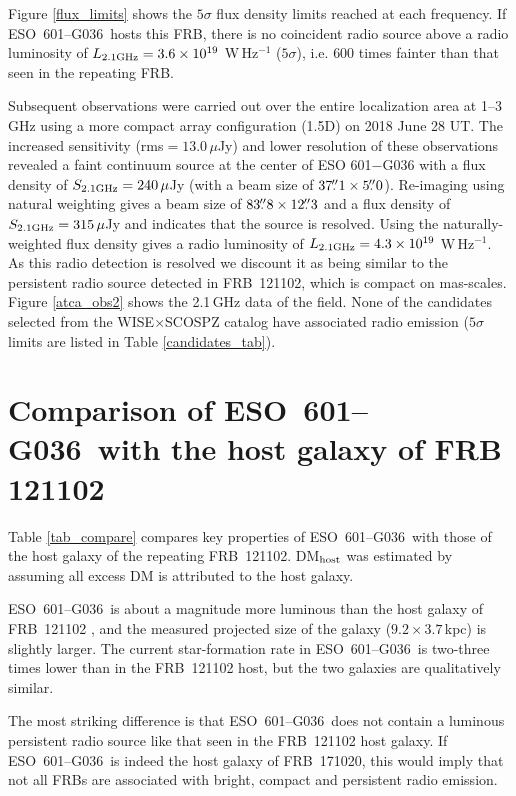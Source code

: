 \documentclass[twocolumn]{aastex63}
\newcommand{\galname}{ESO~601--G036}
\begin{document}
Figure \ref{flux_limits} shows the $5\sigma$ flux density limits reached at each frequency. 
If \galname\ hosts this FRB, 
there is no coincident radio source above a radio luminosity of $L_{\rm 2.1 GHz}=3.6\times 10^{19}$ W\,Hz$^{-1}$ ($5\sigma$), 
i.e. $600$ times fainter than that seen in the repeating FRB. 

Subsequent observations were carried out over the entire localization area at 1--3\,GHz  using a more compact array configuration (1.5D) on 2018 June 28 UT. The increased sensitivity (rms$=13.0\,\mu$Jy) and lower resolution of these observations revealed a faint continuum source at the center of ESO 601$-$G036 with a flux density of $S_{\rm 2.1 GHz}=240\,\mu$Jy (with a beam size of $37\mbox{$.\!\!^{\prime\prime}$}1 \times 5\mbox{$.\!\!^{\prime\prime}$}0$). Re-imaging using natural weighting gives a beam size of $83\mbox{$.\!\!^{\prime\prime}$}8 \times 12\mbox{$.\!\!^{\prime\prime}$}3$ and a flux density of $S_{\rm 2.1 GHz}=315\,\mu$Jy and indicates 
that the source is  resolved. Using the naturally-weighted flux density gives a radio luminosity of $L_{\rm 2.1 GHz}=4.3\times 10^{19}$ W\,Hz$^{-1}$. As this radio detection is resolved we discount it as being similar to the persistent radio source detected in FRB~121102, which is compact on mas-scales. 
Figure \ref{atca_obs2} shows the 2.1\,GHz data of the field. 
None of the candidates selected from the WISE$\times$SCOSPZ catalog 
have associated radio emission 
($5\sigma$ limits are listed in Table \ref{candidates_tab}). 

\section{Comparison of \galname\ with the host galaxy of FRB 121102}

Table \ref{tab_compare} compares key properties of \galname\ with those of the host galaxy of the repeating FRB~121102.
DM$_{\rm host}$ was estimated by assuming all excess DM is 
attributed to the host galaxy. 

\galname\ is about a magnitude more luminous than the host galaxy of FRB~121102 \citep{Tendulkar2017}, and the measured projected size of the galaxy ($9.2\times 3.7$\,kpc) is slightly larger. The current star-formation rate in \galname\ is two-three times lower than in the FRB~121102 host, but the two galaxies are qualitatively similar. 

The most striking difference is that \galname\ does not contain a luminous persistent radio source like that seen in the FRB~121102 host galaxy. If \galname\ is indeed the host galaxy of FRB~171020, this would imply that not all FRBs are associated with bright, compact and persistent radio emission. 
\end{document}
